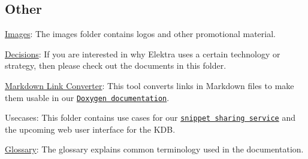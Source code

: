 \subsection*{Other}


\begin{DoxyItemize}
\item \hyperlink{doc_images_README_md}{Images}\+: The images folder contains logos and other promotional material.
\item \hyperlink{doc_decisions_README_md}{Decisions}\+: If you are interested in why Elektra uses a certain technology or strategy, then please check out the documents in this folder.
\item \hyperlink{doc_markdownlinkconverter_README_md}{Markdown Link Converter}\+: This tool converts links in Markdown files to make them usable in our \href{https://doc.libelektra.org/api/current/html}{\tt Doxygen documentation}.
\item Usecases\+: This folder contains use cases for our \href{https://www.libelektra.org/auth/login}{\tt snippet sharing service} and the upcoming web user interface for the K\+DB.
\item \hyperlink{doc_help_elektra-glossary_md}{Glossary}\+: The glossary explains common terminology used in the documentation. 
\end{DoxyItemize}